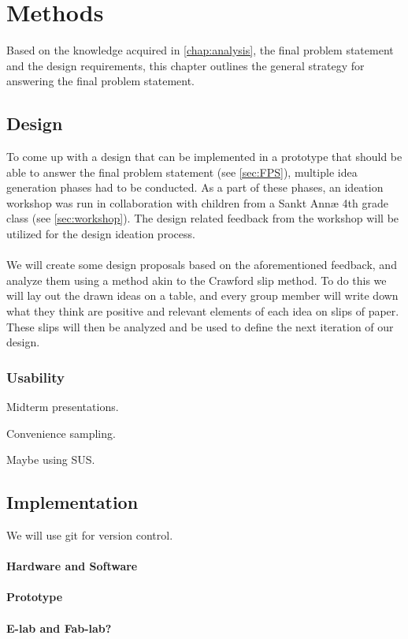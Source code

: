 \chapter{Methods}
Based on the knowledge acquired in \autoref{chap:analysis}, the final problem statement and the design requirements, this chapter outlines the general strategy for answering the final problem statement.
\section{Design}
To come up with a design that can be implemented in a prototype that should be able to answer the final problem statement (see \autoref{sec:FPS}), multiple idea generation phases had to be conducted. As a part of these phases, an ideation workshop was run in collaboration with children from a Sankt Annæ 4th grade class (see \autoref{sec:workshop}). The design related feedback from the workshop will be utilized for the design ideation process.\\\\
We will create some design proposals based on the aforementioned feedback, and analyze them using a method akin to the Crawford slip method\cite{crawfordSlip}. To do this we will lay out the drawn ideas on a table, and every group member will write down what they think are positive and relevant elements of each idea on slips of paper. These slips will then be analyzed and be used to define the next iteration of our design.
\subsection{Usability}
Midterm presentations.

Convenience sampling.

Maybe using SUS.
\section{Implementation}
We will use git for version control.
	\subsubsection *{Hardware and Software}
	
	
	\subsubsection *{Prototype}
	\subsubsection *{E-lab and Fab-lab?}
